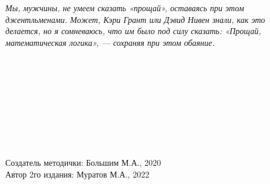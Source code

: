 \documentclass[18pt, a4paper]{extarticle}
\begin{document}
\begin{center}
    \textit{Мы, мужчины, не умеем сказать «прощай», оставаясь при этом джентльменами. Может, Кэри Грант или Дэвид Нивен знали, как это делается, но я сомневаюсь, что им было под силу сказать: «Прощай, математическая логика», — сохраняя при этом обаяние.}
\end{center}
\leavevmode\\\\\leavevmode\\\\\leavevmode\\\\\leavevmode\\\\
\begin{flushright}
	Создатель методички: Большим М.А., 2020\\
	Автор 2го издания: Муратов М.А., 2022
\end{flushright}
\end{document}
